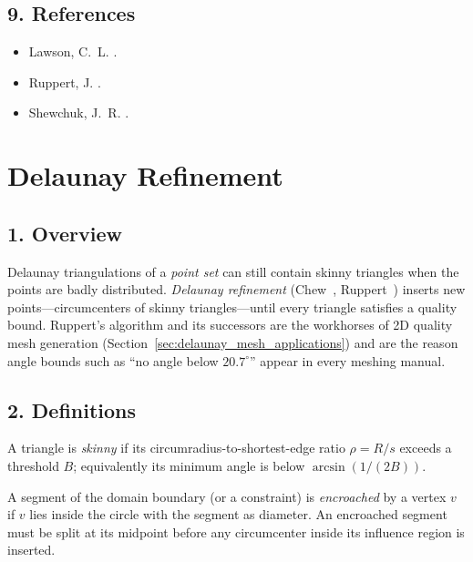 \subsection{9. References}

\begin{itemize}
\item Lawson, C.~L. \cite{lawson1977}.
\item Ruppert, J. \cite{ruppert1995}.
\item Shewchuk, J.~R. \cite{shewchuk1998}.
\end{itemize}

\section{Delaunay Refinement}
\label{sec:delaunay_refinement}

\subsection{1. Overview}

Delaunay triangulations of a \emph{point set} can still contain skinny triangles
when the points are badly distributed. \emph{Delaunay
refinement} (Chew~\cite{chew1989}, Ruppert~\cite{ruppert1995}) inserts new
points---circumcenters of skinny triangles---until every triangle satisfies a
quality bound. Ruppert's algorithm and its successors are the workhorses of
2D quality mesh generation (Section~\ref{sec:delaunay_mesh_applications}) and
are the reason angle bounds such as ``no angle below $20.7^\circ$'' appear in
every meshing manual.

\subsection{2. Definitions}

\begin{definition}\label{def:skinny}
A triangle is \emph{skinny} if its circumradius-to-shortest-edge ratio
$\rho = R / s$ exceeds a threshold $B$; equivalently its minimum angle is below
$\arcsin(1 / (2B))$.
\end{definition}

\begin{definition}\label{def:encroached}
A segment of the domain boundary (or a constraint) is \emph{encroached} by a
vertex $v$ if $v$ lies inside the circle with the segment as diameter. An
encroached segment must be split at its midpoint before any circumcenter inside
its influence region is inserted.
\end{definition}

